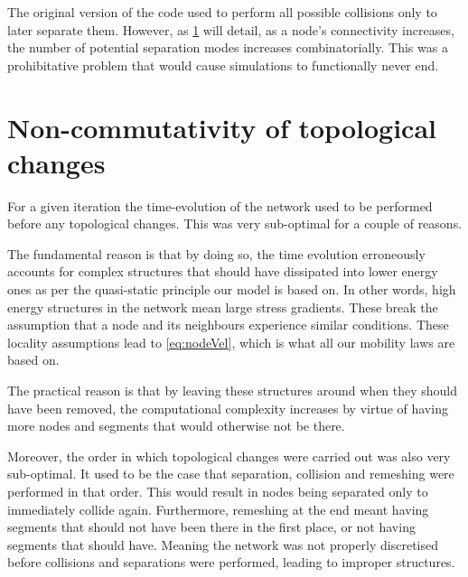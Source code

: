 The original version of the code used to perform all possible collisions only to later separate them. However, as \cref{s:nonCommutativity} will detail, as a node's connectivity increases, the number of potential separation modes increases combinatorially. This was a prohibitative problem that would cause simulations to functionally never end.

\section{Non-commutativity of topological changes}\label{s:nonCommutativity}

For a given iteration the time-evolution of the network used to be performed before any topological changes. This was very sub-optimal for a couple of reasons.

The fundamental reason is that by doing so, the time evolution erroneously accounts for complex structures that should have dissipated into lower energy ones as per the quasi-static principle our model is based on. In other words, high energy structures in the network mean large stress gradients. These break the assumption that a node and its neighbours experience similar conditions. These locality assumptions lead to \cref{eq:nodeVel}, which is what all our mobility laws are based on.

The practical reason is that by leaving these structures around when they should have been removed, the computational complexity increases by virtue of having more nodes and segments that would otherwise not be there.

Moreover, the order in which topological changes were carried out was also very sub-optimal. It used to be the case that separation, collision and remeshing were performed in that order. This would result in nodes being separated only to immediately collide again. Furthermore, remeshing at the end meant having segments that should not have been there in the first place, or not having segments that should have. Meaning the network was not properly discretised before collisions and separations were performed, leading to improper structures.

